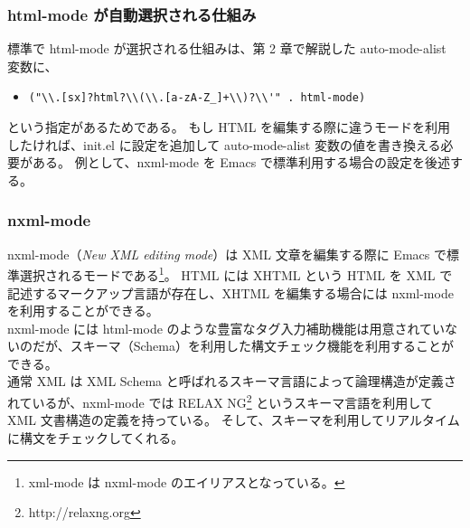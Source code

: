 \subsubsection{html-mode が自動選択される仕組み}
標準で html-mode が選択される仕組みは、第 2 章で解説した auto-mode-alist 変数に、
\begin{itemize}\setlength{\leftskip}{-1.00zw}%
\item[] \verb|("\\.[sx]?html?\\(\\.[a-zA-Z_]+\\)?\\'" . html-mode)|
\end{itemize}
という指定があるためである。
もし HTML を編集する際に違うモードを利用したければ、init.el に設定を追加して auto-mode-alist 変数の値を書き換える必要がある。
例として、nxml-mode を Emacs で標準利用する場合の設定を後述する。
\subsubsection{nxml-mode}
nxml-mode（\emph{New XML editing mode}）は XML 文章を編集する際に Emacs で標準選択されるモードである\footnote{xml-mode は nxml-mode のエイリアスとなっている。}。\enlargethispage{1.25zw}
HTML には XHTML という HTML を XML で記述するマークアップ言語が存在し、XHTML を編集する場合には nxml-mode を利用することができる。\\

nxml-mode には html-mode のような豊富なタグ入力補助機能は用意されていないのだが、スキーマ（Schema）を利用した構文チェック機能を利用することができる。\\

通常 XML は XML Schema と呼ばれるスキーマ言語によって論理構造が定義されているが、nxml-mode では RELAX NG\footnote{http://relaxng.org} というスキーマ言語を利用して XML 文書構造の定義を持っている。
そして、スキーマを利用してリアルタイムに構文をチェックしてくれる。
